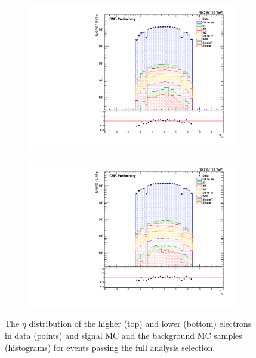 \begin{figure}[!htbp]
    \vspace*{\fill}
    \centering
    \begin{subfigure}[b]{0.65\textwidth}
        \includegraphics[width=\textwidth]{figures/e0_eta.pdf}
        \caption{}
        \label{fig:e_eta_high}
    \end{subfigure}
    \begin{subfigure}[b]{0.65\textwidth}
        \includegraphics[width=\textwidth]{figures/e1_eta.pdf}
        \caption{}
        \label{fig:e_eta_low}
    \end{subfigure}
    \caption[
        The $\eta$ distribution of electrons in data.
    ]{
        The $\eta$ distribution of the higher (top) and lower (bottom) \pt
        electrons in data (points) and \MADGRAPH signal MC and the background
        MC samples (histograms) for events passing the full analysis selection.
    }
    \label{fig:e_eta}
\end{figure}

